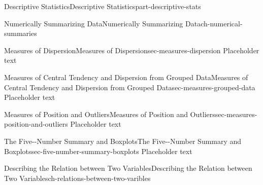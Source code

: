 \documentclass[oneside,10pt,]{book}
\numberwithin{equation}{section}
\begin{document}
\begin{partptx}{Descriptive Statistics}{}{Descriptive Statistics}{}{}{part-descriptive-stats}
\begin{chapterptx}{Numerically Summarizing Data}{}{Numerically Summarizing Data}{}{}{ch-numerical-summaries}
%
%
\typeout{************************************************}
\typeout{************************************************}
%
\begin{sectionptx}{Measures of Dispersion}{}{Measures of Dispersion}{}{}{sec-measures-dispersion}
\hypertarget{p-35}{}%
Placeholder text%
\end{sectionptx}
%
%
\typeout{************************************************}
\typeout{************************************************}
%
\begin{sectionptx}{Measures of Central Tendency and Dispersion from Grouped Data}{}{Measures of Central Tendency and Dispersion from Grouped Data}{}{}{sec-measures-grouped-data}
\hypertarget{p-36}{}%
Placeholder text%
\end{sectionptx}
%
%
\typeout{************************************************}
\typeout{************************************************}
%
\begin{sectionptx}{Measures of Position and Outliers}{}{Measures of Position and Outliers}{}{}{sec-measures-position-and-outliers}
\hypertarget{p-37}{}%
Placeholder text%
\end{sectionptx}
%
%
\typeout{************************************************}
\typeout{************************************************}
%
\begin{sectionptx}{The Five-{}-{}Number Summary and Boxplots}{}{The Five-{}-{}Number Summary and Boxplots}{}{}{sec-five-number-summary-boxplots}
\hypertarget{p-38}{}%
Placeholder text%
\end{sectionptx}
\end{chapterptx}
%
\typeout{************************************************}
\typeout{************************************************}
%
\begin{chapterptx}{Describing the Relation between Two Variables}{}{Describing the Relation between Two Variables}{}{}{ch-relations-between-two-varibles}
\end{chapterptx}
\end{partptx}
%
%
\typeout{************************************************}
\typeout{************************************************}
%
\end{document}
